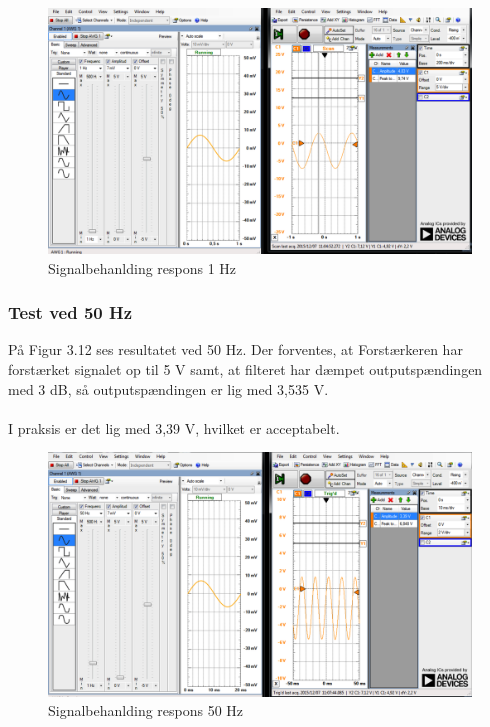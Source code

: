 \begin{figure}[H]
	\centering
	\includegraphics[width=1\textwidth]{Figurer/Snip20151207_42}	\caption{Signalbehanlding respons 1 Hz}
	\label{fig:Signalbehanlding}
\end{figure}

\subsubsection{Test ved 50 Hz}
På Figur 3.12 ses resultatet ved 50 Hz. Der forventes, at Forstærkeren har forstærket signalet op til 5 V samt, at filteret har dæmpet outputspændingen med 3 dB, så outputspændingen er lig med 3,535 V. 
\\ \\
I praksis er det lig med 3,39 V, hvilket er acceptabelt.    
  

\begin{figure}[H]
	\centering
	\includegraphics[width=1\textwidth]{Figurer/Snip20151207_43}
	\caption{Signalbehanlding respons 50 Hz}
	\label{fig:Signalbehanlding}
\end{figure}

